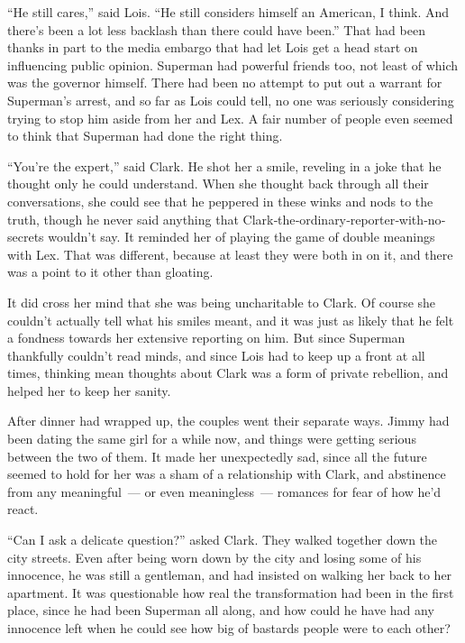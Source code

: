 \documentclass[ebook,12pt]{memoir}
\begin{document}
``He still cares,'' said Lois. ``He still considers himself an American,
I think. And there's been a lot less backlash than there could have
been.'' That had been thanks in part to the media embargo that had let
Lois get a head start on influencing public opinion. Superman had
powerful friends too, not least of which was the governor himself. There
had been no attempt to put out a warrant for Superman's arrest, and so
far as Lois could tell, no one was seriously considering trying to stop
him aside from her and Lex. A fair number of people even seemed to think
that Superman had done the right thing.

``You're the expert,'' said Clark. He shot her a smile, reveling in a
joke that he thought only he could understand. When she thought back
through all their conversations, she could see that he peppered in these
winks and nods to the truth, though he never said anything that
Clark‐the‐ordinary‐reporter‐with‐no‐secrets wouldn't say. It reminded
her of playing the game of double meanings with Lex. That was different,
because at least they were both in on it, and there was a point to it
other than gloating.

It did cross her mind that she was being uncharitable to Clark. Of
course she couldn't actually tell what his smiles meant, and it was just
as likely that he felt a fondness towards her extensive reporting on
him. But since Superman thankfully couldn't read minds, and since Lois
had to keep up a front at all times, thinking mean thoughts about Clark
was a form of private rebellion, and helped her to keep her sanity.

After dinner had wrapped up, the couples went their separate ways. Jimmy
had been dating the same girl for a while now, and things were getting
serious between the two of them. It made her unexpectedly sad, since all
the future seemed to hold for her was a sham of a relationship with
Clark, and abstinence from any meaningful~--- or even meaningless~---
romances for fear of how he'd react.

``Can I ask a delicate question?'' asked Clark. They walked together
down the city streets. Even after being worn down by the city and losing
some of his innocence, he was still a gentleman, and had insisted on
walking her back to her apartment. It was questionable how real the
transformation had been in the first place, since he had been Superman
all along, and how could he have had any innocence left when he could
see how big of bastards people were to each other?
\end{document}

